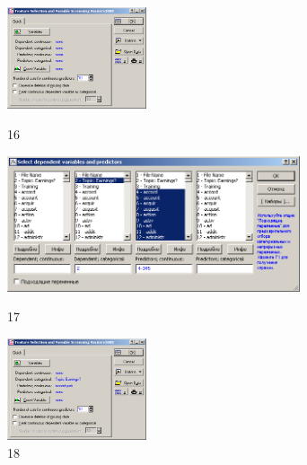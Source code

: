 \begin{figure}[!h]
  \centering

  \begin{minipage}{0.22\textwidth}
    \centering

    \includegraphics[height=3cm]
    {inc/16.PNG}

    \caption{16}

    \label{fig:16}
  \end{minipage}
  \begin{minipage}{0.52\textwidth}
    \centering

    \includegraphics[height=4cm]
    {inc/17.PNG}

    \caption{17}

    \label{fig:17}
  \end{minipage}
  \begin{minipage}{0.22\textwidth}
    \centering

    \includegraphics[height=3cm]
    {inc/18.PNG}

    \caption{18}

    \label{fig:18}
  \end{minipage}
\end{figure}

